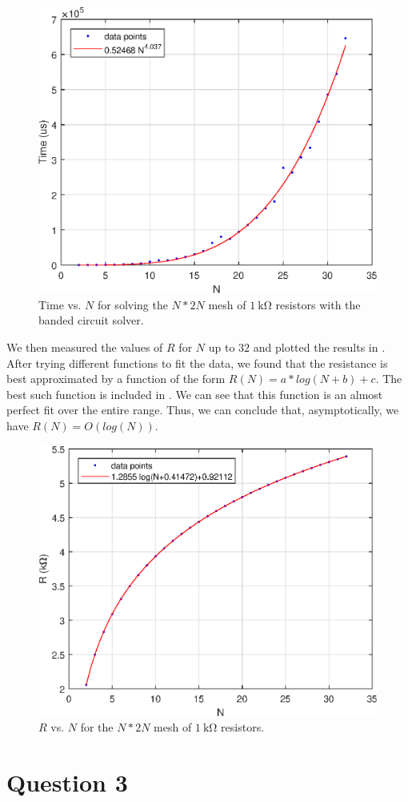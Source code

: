 \documentclass[journal,hidelinks]{IEEEtran}
\begin{document}
\begin{figure}[!htb]
  \centering
  \includegraphics[width=0.6\columnwidth]{question-2/banded_time.eps}
  \caption{Time vs. $N$ for solving the $N * 2N$ mesh of $\SI{1}{\kilo\ohm}$ resistors with the banded circuit solver.}
  \label{fig:q2-band-time}
\end{figure}

We then measured the values of $R$ for $N$ up to $32$ and plotted the results in . After trying different functions to fit the data, we found that the resistance is best approximated by a function of the form $R(N) = a * log(N + b) + c$. The best such function is included in . We can see that this function is an almost perfect fit over the entire range. Thus, we can conclude that, asymptotically, we have $R(N) = O(log(N))$.

\begin{figure}[!htb]
  \centering
  \includegraphics[width=0.6\columnwidth]{question-2/resistance.eps}
  \caption{$R$ vs. $N$ for the $N * 2N$ mesh of $\SI{1}{\kilo\ohm}$ resistors.}
  \label{fig:q2-resistance}
\end{figure}

\section*{Question 3}
\end{document}

